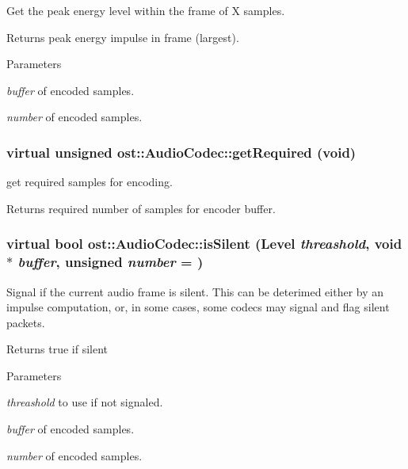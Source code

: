 Get the peak energy level within the frame of X samples. \begin{DoxyReturn}{Returns}
peak energy impulse in frame (largest). 
\end{DoxyReturn}

\begin{DoxyParams}{Parameters}
\item[{\em buffer}]of encoded samples. \item[{\em number}]of encoded samples. \end{DoxyParams}
\subsubsection[{getRequired}]{\setlength{\rightskip}{0pt plus 5cm}virtual unsigned ost::AudioCodec::getRequired (void)\hspace{0.3cm}{\ttfamily  [virtual]}}\label{classost_1_1_audio_codec_ab5164fbce2e6d1dde35554f039fb2379}


get required samples for encoding. \begin{DoxyReturn}{Returns}
required number of samples for encoder buffer. 
\end{DoxyReturn}
\subsubsection[{isSilent}]{\setlength{\rightskip}{0pt plus 5cm}virtual bool ost::AudioCodec::isSilent ({\bf Level} {\em threashold}, \/  void $\ast$ {\em buffer}, \/  unsigned {\em number} = {})\hspace{0.3cm}{\ttfamily  [virtual]}}\label{classost_1_1_audio_codec_aa444bf042a79428d91958a38973ded8e}


Signal if the current audio frame is silent. This can be deterimed either by an impulse computation, or, in some cases, some codecs may signal and flag silent packets.

\begin{DoxyReturn}{Returns}
true if silent 
\end{DoxyReturn}

\begin{DoxyParams}{Parameters}
\item[{\em threashold}]to use if not signaled. \item[{\em buffer}]of encoded samples. \item[{\em number}]of encoded samples. \end{DoxyParams}
